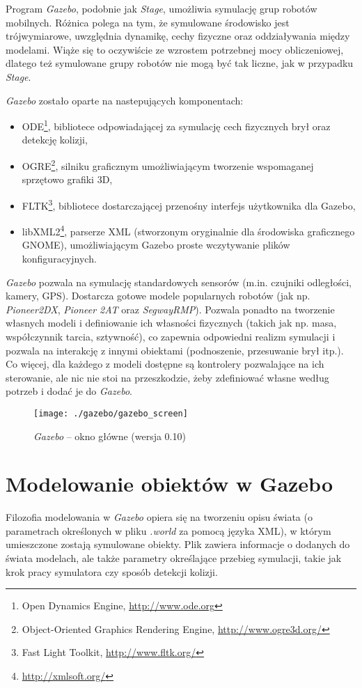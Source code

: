  	Program \textit{Gazebo}, podobnie jak \textit{Stage}, umożliwia symulację grup robotów mobilnych. Różnica polega na tym, że symulowane
 	środowisko jest trójwymiarowe, uwzględnia dynamikę, cechy fizyczne oraz oddziaływania między modelami. Wiąże się
 	to oczywiście ze wzrostem potrzebnej mocy obliczeniowej, dlatego też symulowane grupy robotów nie
 	mogą być tak liczne, jak w przypadku \textit{Stage}.
 	 	
 	\textit{Gazebo} zostało oparte na nastepujących komponentach:
 	\begin{itemize}
 	 \item ODE\footnote{Open Dynamics Engine, \url{http://www.ode.org}}, bibliotece  odpowiadającej za symulację
 	 	cech fizycznych brył oraz detekcję kolizji,
 	 \item OGRE\footnote{Object-Oriented Graphics Rendering Engine, \url{http://www.ogre3d.org/}}, 
		silniku graficznym umożliwiającym tworzenie wspomaganej sprzętowo grafiki 3D,
 	 \item FLTK\footnote{Fast Light Toolkit, \url{http://www.fltk.org/}}, bibliotece dostarczającej 
		przenośny interfejs użytkownika dla Gazebo,
	 \item libXML2\footnote{ \url{http://xmlsoft.org/}}, parserze XML (stworzonym oryginalnie dla środowiska graficznego GNOME), umożliwiającym Gazebo proste wczytywanie plików konfiguracyjnych.
 	\end{itemize}

	\textit{Gazebo} pozwala na symulację standardowych sensorów (m.in. czujniki odległości, kamery, GPS). Dostarcza gotowe modele 
	popularnych robotów (jak np. \textit{Pioneer2DX}, \textit{Pioneer 2AT} oraz \textit{SegwayRMP}). Pozwala ponadto na tworzenie własnych modeli
	i definiowanie ich własności fizycznych (takich jak np. masa, współczynnik tarcia, sztywność), co zapewnia odpowiedni realizm
	symulacji i pozwala na interakcję z innymi obiektami (podnoszenie, przesuwanie brył itp.). Co więcej, dla każdego z modeli
	dostępne są kontrolery pozwalające na ich sterowanie, ale nic nie stoi na przeszkodzie, żeby zdefiniować własne według potrzeb i dodać je do \textit{Gazebo}. 
	\begin{figure}[!t]
	\centering
	\label{fig:gazebo}
	\texttt{[image: ./gazebo/gazebo\_screen]}
	\caption{\textit{Gazebo} -- okno główne (wersja 0.10)}
	\end{figure}

	\section{Modelowanie obiektów w Gazebo}
	Filozofia modelowania w \textit{Gazebo} opiera się na tworzeniu opisu świata (o parametrach określonych 
	w pliku \textit{.world} za pomocą języka XML), w którym umieszczone zostają symulowane obiekty. Plik zawiera informacje o dodanych do świata modelach, ale także parametry określające przebieg symulacji, takie 
	jak krok pracy symulatora czy sposób detekcji kolizji. 
